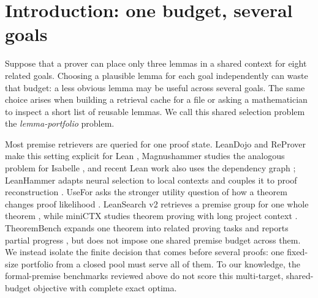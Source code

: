 \begin{abstract}
Premise selection normally asks which lemmas may help one proof state.  We study
the shared-budget problem: which small lemma set best serves several related
goals at once?  A \method{} episode displays the types of 16 name-masked
candidates and eight name-masked targets, and asks for three candidates.  A
target is covered when at least one chosen candidate occurs directly in its
historical elaborated value.  We construct 30 development and 60 test episodes
from \mathlib{} v4.33.0, enumerate all 560 portfolios, retain every maximizer,
and independently replay the dependency labels in pinned Lean.  The public test
set and label digest were committed before the response captures were supplied.
\ResultAbstractSentence On common 20-episode ID sets, structured versus direct
scores were 1/20 versus 4/20 (Pro) and 0/20 versus 1/20 (xhigh); this $q=2$
pipeline did not improve exact accuracy.  The task measures compression of historical dependencies,
not proof success under added premises.
\end{abstract}

\section{Introduction: one budget, several goals}

Suppose that a prover can place only three lemmas in a shared context for eight
related goals.  Choosing a plausible lemma for each goal independently can
waste that budget: a less obvious lemma may be useful across several goals.
The same choice arises when building a retrieval cache for a file or asking a
mathematician to inspect a short list of reusable lemmas.  We call this shared
selection problem the \emph{lemma-portfolio} problem.

Most premise retrievers are queried for one proof state.  LeanDojo and ReProver
make this setting explicit for Lean \citep{yang2023leandojo}, Magnushammer
studies the analogous problem for Isabelle \citep{mikula2024magnushammer}, and
recent Lean work also uses the dependency graph
\citep{petrovic2025structural}; LeanHammer adapts neural selection to local
contexts and couples it to proof reconstruction \citep{zhu2026leanhammer}.
UseFor asks the stronger utility question of
how a theorem changes proof likelihood \citep{kasriel2025usefor}.  LeanSearch
v2 retrieves a premise group for one whole theorem \citep{gao2026leansearchv2},
while miniCTX studies theorem proving with long project context
\citep{hu2025minictx}.  TheoremBench expands one theorem into related proving
tasks and reports partial progress \citep{pham2026theorembench}, but does not
impose one shared premise budget across them.  We instead isolate the finite
decision that comes before several proofs: one fixed-size portfolio from a
closed pool must serve all of them.  To our knowledge, the formal-premise
benchmarks reviewed above do not score this multi-target, shared-budget
objective with complete exact optima.


